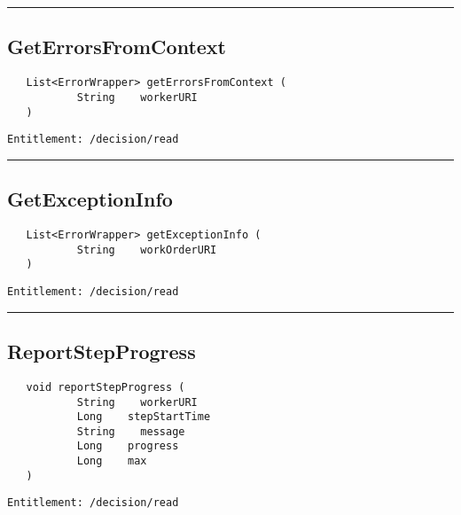 \rule{12cm}{2pt}
\subsection{GetErrorsFromContext}
\label{Api:GetErrorsFromContext}
\begin{verbatim}
   List<ErrorWrapper> getErrorsFromContext (
           String    workerURI
   )
\end{verbatim}
\begin{Verbatim}[fontsize=\small, formatcom=\color{Maroon}]
  Entitlement: /decision/read
\end{Verbatim}



\rule{12cm}{2pt}
\subsection{GetExceptionInfo}
\label{Api:GetExceptionInfo}
\begin{verbatim}
   List<ErrorWrapper> getExceptionInfo (
           String    workOrderURI
   )
\end{verbatim}
\begin{Verbatim}[fontsize=\small, formatcom=\color{Maroon}]
  Entitlement: /decision/read
\end{Verbatim}



\rule{12cm}{2pt}
\subsection{ReportStepProgress}
\label{Api:ReportStepProgress}
\begin{verbatim}
   void reportStepProgress (
           String    workerURI
           Long    stepStartTime
           String    message
           Long    progress
           Long    max
   )
\end{verbatim}
\begin{Verbatim}[fontsize=\small, formatcom=\color{Maroon}]
  Entitlement: /decision/read
\end{Verbatim}



